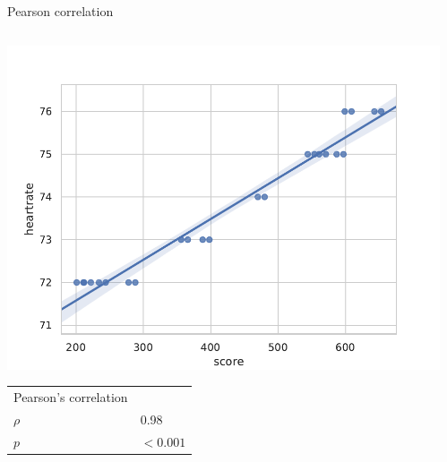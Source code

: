 \documentclass[compress]{beamer}
\begin{document}
\begin{frame}{Pearson correlation}

    \begin{columns}
        \begin{column}{0.5\linewidth}

            \includegraphics[width=\columnwidth]{code/dataset1-corr-heartrate.pdf}

            \begin{center}
                \tiny
                \begin{tabular}{ll}
                    \toprule
                    Pearson's correlation & \\
                    $\rho$      &  0.98  \\
                    $p$   &   $< 0.001$\\
                    \bottomrule
                \end{tabular}
            \end{center}

        \end{column}
        \begin{column}{0.5\linewidth}
\end{column}
\end{columns}
\end{frame}
\end{document}

